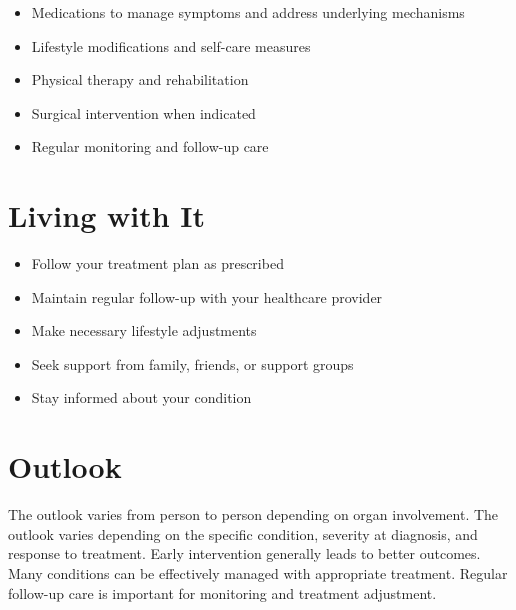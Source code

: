 \begin{itemize}[noitemsep]
  \item Medications to manage symptoms and address underlying mechanisms
  \item Lifestyle modifications and self-care measures
  \item Physical therapy and rehabilitation
  \item Surgical intervention when indicated
  \item Regular monitoring and follow-up care
\end{itemize}
\section{Living with It}
\begin{itemize}[noitemsep]
  \item Follow your treatment plan as prescribed
  \item Maintain regular follow-up with your healthcare provider
  \item Make necessary lifestyle adjustments
  \item Seek support from family, friends, or support groups
  \item Stay informed about your condition
\end{itemize}
\section{Outlook}
The outlook varies from person to person depending on organ involvement. The outlook varies depending on the specific condition, severity at diagnosis, and response to treatment. Early intervention generally leads to better outcomes. Many conditions can be effectively managed with appropriate treatment. Regular follow-up care is important for monitoring and treatment adjustment.
